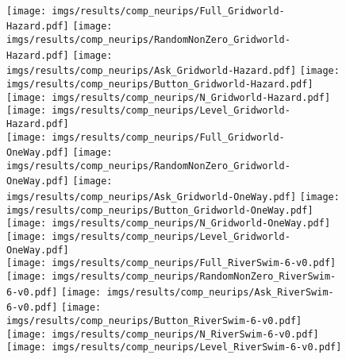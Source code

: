 \begin{figure}[tbh]
\begin{subfigure}[b]{0.158\textwidth}
    \end{subfigure} 
    \\
    \hfill
    \texttt{[image: imgs/results/comp\_neurips/Full\_Gridworld-Hazard.pdf]}
    \hfill
     \texttt{[image: imgs/results/comp\_neurips/RandomNonZero\_Gridworld-Hazard.pdf]}
    \hfill
    \texttt{[image: imgs/results/comp\_neurips/Ask\_Gridworld-Hazard.pdf]}
    \hfill
     \texttt{[image: imgs/results/comp\_neurips/Button\_Gridworld-Hazard.pdf]} 
    \hfill
    \texttt{[image: imgs/results/comp\_neurips/N\_Gridworld-Hazard.pdf]}
    \hfill
    \texttt{[image: imgs/results/comp\_neurips/Level\_Gridworld-Hazard.pdf]}
    \\
    \hfill
    \texttt{[image: imgs/results/comp\_neurips/Full\_Gridworld-OneWay.pdf]}
    \hfill
     \texttt{[image: imgs/results/comp\_neurips/RandomNonZero\_Gridworld-OneWay.pdf]}
    \hfill
    \texttt{[image: imgs/results/comp\_neurips/Ask\_Gridworld-OneWay.pdf]}
    \hfill
     \texttt{[image: imgs/results/comp\_neurips/Button\_Gridworld-OneWay.pdf]} 
    \hfill
    \texttt{[image: imgs/results/comp\_neurips/N\_Gridworld-OneWay.pdf]}
    \hfill
    \texttt{[image: imgs/results/comp\_neurips/Level\_Gridworld-OneWay.pdf]}
    \\
    \hfill
    \texttt{[image: imgs/results/comp\_neurips/Full\_RiverSwim-6-v0.pdf]}
    \hfill
     \texttt{[image: imgs/results/comp\_neurips/RandomNonZero\_RiverSwim-6-v0.pdf]}
    \hfill
    \texttt{[image: imgs/results/comp\_neurips/Ask\_RiverSwim-6-v0.pdf]}
    \hfill
     \texttt{[image: imgs/results/comp\_neurips/Button\_RiverSwim-6-v0.pdf]} 
    \hfill
    \texttt{[image: imgs/results/comp\_neurips/N\_RiverSwim-6-v0.pdf]}
    \hfill
    \texttt{[image: imgs/results/comp\_neurips/Level\_RiverSwim-6-v0.pdf]}
    \\
    \hfill

\end{figure}
